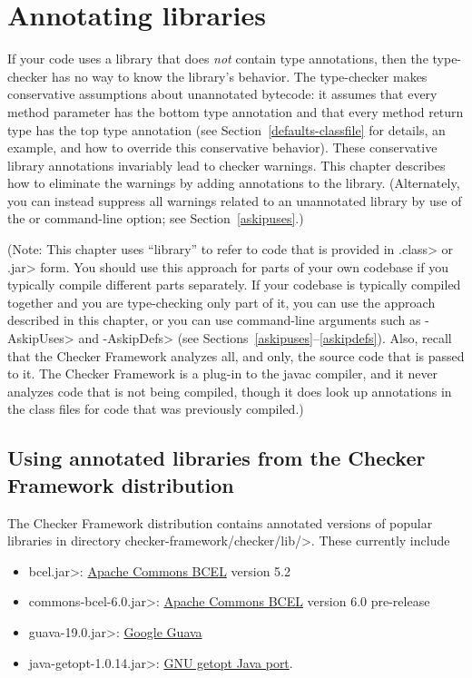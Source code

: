 \htmlhr
\chapter{Annotating libraries\label{annotating-libraries}}

If your code uses a library that does \emph{not} contain type annotations,
then the type-checker has no way to know the library's behavior.
The type-checker
makes conservative assumptions about unannotated bytecode:  it assumes that
every method parameter has the bottom type annotation and that every method
return type has the top type annotation (see
Section~\ref{defaults-classfile} for details, an example, and how to
override this conservative behavior).
These conservative library
annotations invariably lead to checker warnings.
This chapter describes how to eliminate
the warnings by adding annotations to the library.
(Alternately, you can instead
suppress all warnings related to an unannotated library by use of the
 or  command-line option; see
Section~\ref{askipuses}.)

(Note: This chapter uses ``library'' to refer to code that is provided in
\<.class> or \<.jar> form.  You should use this approach for parts of your
own codebase if you typically compile different parts separately.  If
your codebase is typically compiled together and you are type-checking only
part of it, you can use the approach described in this chapter, or you can
use command-line arguments such as \<-AskipUses> and \<-AskipDefs> (see
Sections~\ref{askipuses}--\ref{askipdefs}).  Also, recall that the Checker
Framework analyzes all, and only, the source code that is passed to it.
The Checker Framework is a plug-in to the javac compiler, and it never
analyzes code that is not being compiled, though it does look up
annotations in the class files for code that was previously compiled.)


\section{Using annotated libraries from the Checker Framework distribution\label{annotated-libraries-using}}

The Checker Framework distribution contains annotated versions of popular
libraries in directory \<checker-framework/checker/lib/>.
These currently include
\begin{itemize}
\item \<bcel.jar>:
  \href{https://commons.apache.org/proper/commons-bcel/}{Apache Commons BCEL} version 5.2
\item \<commons-bcel-6.0.jar>:
  \href{https://commons.apache.org/proper/commons-bcel/}{Apache Commons
    BCEL} version 6.0 pre-release
\item \<guava-19.0.jar>:
  \href{https://github.com/google/guava/}{Google Guava}
\item \<java-getopt-1.0.14.jar>:
  \href{https://github.com/arenn/java-getopt}{GNU getopt Java port}.
\end{itemize}

